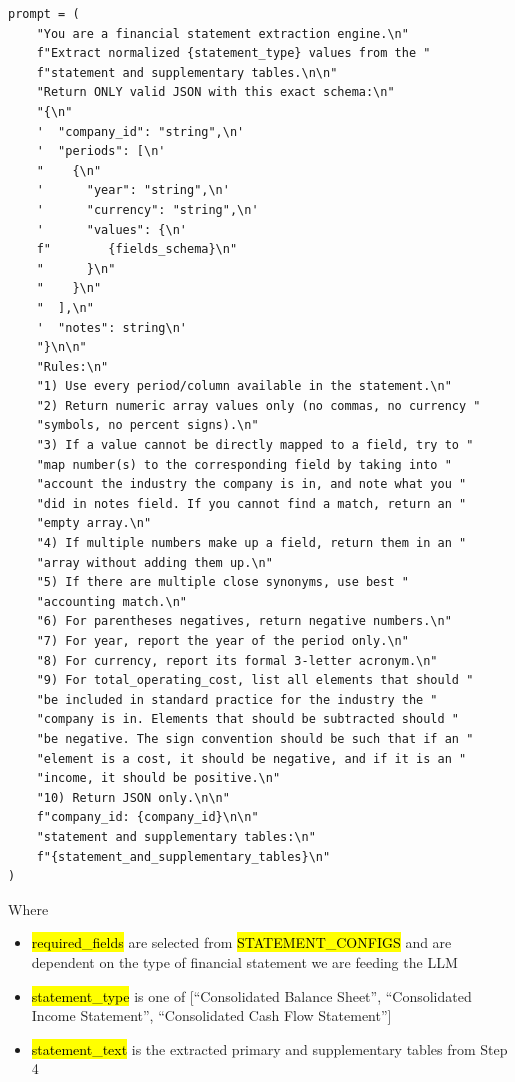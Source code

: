 \documentclass[12pt,a4paper]{article}
\begin{document}
\begin{lstlisting}[style=python, caption={Step~5 prompt (original): extracting normalized financial fields as JSON}, label=lst:prompt_step5_original]
prompt = (
    "You are a financial statement extraction engine.\n"
    f"Extract normalized {statement_type} values from the "
    f"statement and supplementary tables.\n\n"
    "Return ONLY valid JSON with this exact schema:\n"
    "{\n"
    '  "company_id": "string",\n'
    '  "periods": [\n'
    "    {\n"
    '      "year": "string",\n'
    '      "currency": "string",\n'
    '      "values": {\n'
    f"        {fields_schema}\n"
    "      }\n"
    "    }\n"
    "  ],\n"
    '  "notes": string\n'
    "}\n\n"
    "Rules:\n"
    "1) Use every period/column available in the statement.\n"
    "2) Return numeric array values only (no commas, no currency "
    "symbols, no percent signs).\n"
    "3) If a value cannot be directly mapped to a field, try to "
    "map number(s) to the corresponding field by taking into "
    "account the industry the company is in, and note what you "
    "did in notes field. If you cannot find a match, return an "
    "empty array.\n"
    "4) If multiple numbers make up a field, return them in an "
    "array without adding them up.\n"
    "5) If there are multiple close synonyms, use best "
    "accounting match.\n"
    "6) For parentheses negatives, return negative numbers.\n"
    "7) For year, report the year of the period only.\n"
    "8) For currency, report its formal 3-letter acronym.\n"
    "9) For total_operating_cost, list all elements that should "
    "be included in standard practice for the industry the "
    "company is in. Elements that should be subtracted should "
    "be negative. The sign convention should be such that if an "
    "element is a cost, it should be negative, and if it is an "
    "income, it should be positive.\n"
    "10) Return JSON only.\n\n"
    f"company_id: {company_id}\n\n"
    "statement and supplementary tables:\n"
    f"{statement_and_supplementary_tables}\n"
)
\end{lstlisting}

Where

\begin{itemize}
\item
  \hl{required\_fields} are selected from \hl{STATEMENT\_CONFIGS} and
  are dependent on the type of financial statement we are feeding the
  LLM
\item
  \hl{statement\_type} is one of {[}``Consolidated Balance Sheet'',
  ``Consolidated Income Statement'', ``Consolidated Cash Flow
  Statement''{]}
\item
  \hl{statement\_text} is the extracted primary and supplementary tables
  from Step 4
\end{itemize}
\end{document}
